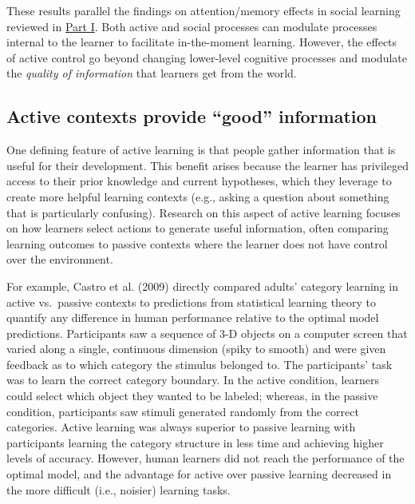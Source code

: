 \documentclass[english,floatsintext,man]{apa6}
\theoremstyle{definition}
\theoremstyle{definition}
\theoremstyle{definition}
\theoremstyle{remark}
\begin{document}
These results parallel the findings on attention/memory effects in
social learning reviewed in \protect\hyperlink{p1}{Part I}. Both active
and social processes can modulate processes internal to the learner to
facilitate in-the-moment learning. However, the effects of active
control go beyond changing lower-level cognitive processes and modulate
the \emph{quality of information} that learners get from the world.

\subsection{\texorpdfstring{Active contexts provide \enquote{good}
information}{Active contexts provide good information}}\label{active-contexts-provide-good-information}

One defining feature of active learning is that people gather
information that is useful for their development. This benefit arises
because the learner has privileged access to their prior knowledge and
current hypotheses, which they leverage to create more helpful learning
contexts (e.g., asking a question about something that is particularly
confusing). Research on this aspect of active learning focuses on how
learners select actions to generate useful information, often comparing
learning outcomes to passive contexts where the learner does not have
control over the environment.

For example, Castro et al. (2009) directly compared adults' category
learning in active vs.~passive contexts to predictions from statistical
learning theory to quantify any difference in human performance relative
to the optimal model predictions. Participants saw a sequence of 3-D
objects on a computer screen that varied along a single, continuous
dimension (spiky to smooth) and were given feedback as to which category
the stimulus belonged to. The participants' task was to learn the
correct category boundary. In the active condition, learners could
select which object they wanted to be labeled; whereas, in the passive
condition, participants saw stimuli generated randomly from the correct
categories. Active learning was always superior to passive learning with
participants learning the category structure in less time and achieving
higher levels of accuracy. However, human learners did not reach the
performance of the optimal model, and the advantage for active over
passive learning decreased in the more difficult (i.e., noisier)
learning tasks.
\end{document}
